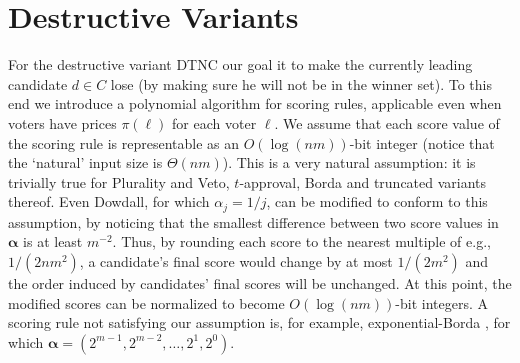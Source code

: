 \documentclass[letterpaper]{article} %
\newcommand{\vecgreek}{\bm}
\newcommand{\veca}{\vecgreek{\alpha}}
\newcommand{\SC}{\textsc{Set Cover}}
\newcommand{\DTNC}{\textsc{DTNC}}
\newcommand{\diff}{\mathrm{diff}}
\newcommand{\NP}{\mathrm{NP}}
\newcommand{\Pclass}{\mathrm{P}}
\begin{document}

\section{Destructive Variants}
For the destructive variant \DTNC{} our goal it to make the currently leading candidate $d \in C$ lose (by making sure he will not be in the winner set). To this end we introduce a polynomial algorithm for scoring rules, applicable even when voters have prices $\pi(\ell)$ for each voter $\ell$. We assume that  each score value of the scoring rule is representable as an $O(\log{(nm)})$-bit integer (notice that the `natural' input size is $\Theta(nm)$). This is a very natural assumption: it is trivially true for Plurality and Veto, $t$-approval, Borda and truncated variants thereof. Even Dowdall, for which $\alpha_j = 1/j$, can be modified to conform to this assumption, by noticing that the smallest difference between two score values in $\veca$ is at least $m^{-2}$. Thus, by rounding each score to the nearest multiple of e.g., $1/(2nm^2)$, a candidate's final score would change by at most $1/(2m^2)$ and the order induced by candidates' final scores will be unchanged. At this point, the modified scores can be normalized to become $O(\log{(nm)})$-bit integers. A scoring rule not satisfying our assumption is, for example, exponential-Borda \cite{DBLP:journals/tcci/PutF16}, for which $\veca=(2^{m-1},2^{m-2},\ldots,2^1,2^0)$.

\end{document}
